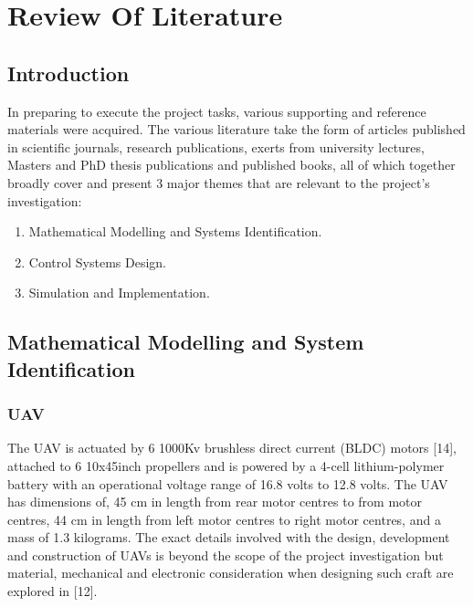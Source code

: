 \documentclass[12pt,a4paper,twoside]{report}
\begin{document}
	\newpage
	
	\chapter{Review Of Literature}	
	
		\section{Introduction}
		
			In preparing to execute the project tasks, various supporting and reference materials were acquired. The various literature take the form of articles published in scientific journals, research publications, exerts from university lectures, Masters and PhD thesis publications and published books, all of which together broadly cover and present 3 major themes that are relevant to the project’s investigation:
		
			\begin{enumerate}
				\item 
					Mathematical Modelling and Systems Identification. 
				\item 
					Control Systems Design.
				\item 
					Simulation and Implementation.
			\end{enumerate}
		
		\section{Mathematical Modelling and System Identification}
			
			\subsection{UAV}
				
				The UAV is actuated by 6 1000Kv brushless direct current (BLDC) motors [14], attached to 6 10x45inch propellers and is powered by a 4-cell lithium-polymer battery with an operational voltage range of 16.8 volts to 12.8 volts. The UAV has dimensions of, 45 cm in length from rear motor centres to from motor centres, 44 cm in length from left motor centres to right motor centres, and a mass of 1.3 kilograms. The exact details involved with the design, development and construction of UAVs is beyond the scope of the project investigation but material, mechanical and electronic consideration when designing such craft are explored in [12].
				
\end{document}
